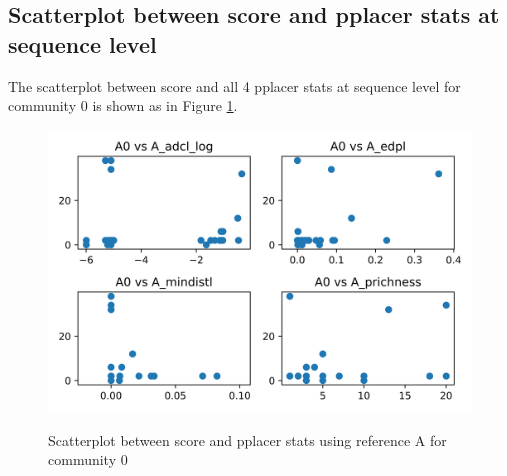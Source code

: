 \documentclass{article}
\begin{document}
\subsection{Scatterplot between score and pplacer stats at sequence level}
The scatterplot between score and all 4 pplacer stats at sequence level for community 0 is shown as in Figure \ref{ReferenceA-community0-scatter}.
\begin{figure}[H]
	\centering
	\includegraphics[width=\textwidth, keepaspectratio]{ReferenceA-community0-scatter.png}\\
	\caption{Scatterplot between score and pplacer stats using reference A for community 0}
	\label{ReferenceA-community0-scatter}
\end{figure}
\end{document}
